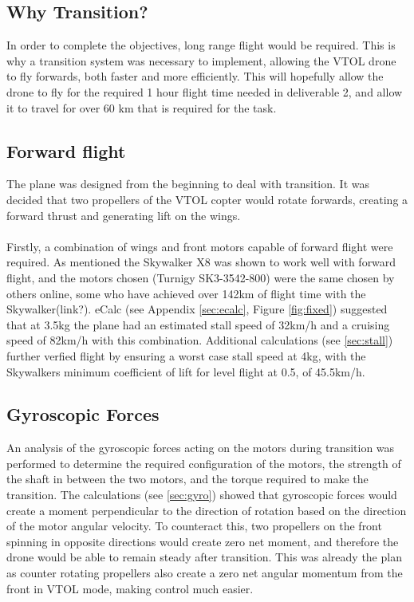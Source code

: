 

\subsection{Why Transition?}
In order to complete the objectives, long range flight would be required. This is why a transition system was necessary to implement, allowing the VTOL drone to fly forwards, both faster and more efficiently. This will hopefully allow the drone to fly for the required 1 hour flight time needed in deliverable 2, and allow it to travel for over 60 km that is required for the task. 

\subsection{Forward flight}
The plane was designed from the beginning to deal with transition. It was decided that two propellers of the VTOL copter would rotate forwards, creating a forward thrust and generating lift on the wings.  
\\\\
Firstly, a combination of wings and front motors capable of forward flight were required.  As mentioned the Skywalker X8 was shown to work well with forward flight, and the motors chosen (Turnigy SK3-3542-800) were the same chosen by others online, some who have achieved over 142km of flight time with the Skywalker(link?). eCalc (see Appendix \ref{sec:ecalc}, Figure \ref{fig:fixed}) suggested that at 3.5kg the plane had an estimated stall speed of 32km/h and a cruising speed of 82km/h with this combination. Additional calculations (see \ref{sec:stall}) further verfied flight by ensuring a worst case stall speed at 4kg, with the Skywalkers minimum coefficient of lift for level flight at 0.5, of 45.5km/h. 

\subsection{Gyroscopic Forces}
An analysis of the gyroscopic forces acting on the motors during transition was performed to determine the required configuration of the motors, the strength of the shaft in between the two motors, and the torque required to make the transition. The calculations (see  \ref{sec:gyro}) showed that gyroscopic forces would create a moment perpendicular to the direction of rotation based on the direction of the motor angular velocity. To counteract this, two propellers on the front spinning in opposite directions would create zero net moment, and therefore the drone would be able to remain steady after transition. This was already the plan as counter rotating propellers also create a zero net angular momentum from the front in VTOL mode, making control much easier.\\

